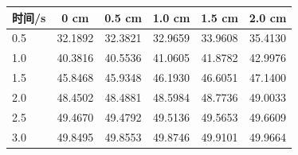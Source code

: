 \begin{tabular}{lccccc}
\toprule
时间/s & 0 cm & 0.5 cm & 1.0 cm & 1.5 cm & 2.0 cm \\
\midrule
0.5 & 32.1892 & 32.3821 & 32.9659 & 33.9608 & 35.4130 \\
1.0 & 40.3816 & 40.5536 & 41.0605 & 41.8782 & 42.9976 \\
1.5 & 45.8468 & 45.9348 & 46.1930 & 46.6051 & 47.1400 \\
2.0 & 48.4502 & 48.4881 & 48.5984 & 48.7736 & 49.0033 \\
2.5 & 49.4670 & 49.4792 & 49.5136 & 49.5653 & 49.6609 \\
3.0 & 49.8495 & 49.8553 & 49.8746 & 49.9101 & 49.9664 \\
\bottomrule
\end{tabular}
